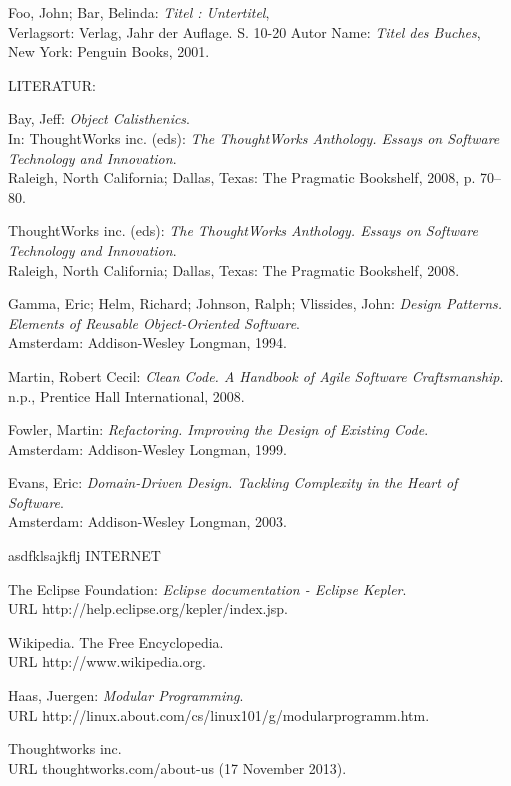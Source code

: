 \documentclass[11pt,a4paper,oneside, 
liststotoc, 					%
bibtotoc,						%
titlepage, 						%
headsepline, 					%
BCOR6mm,						%
english
]{scrreprt}
\begin{document}
\begin{thebibliography}{999999}

 Foo, John; Bar, Belinda: \emph{Titel : Untertitel},\\ Verlagsort: Verlag, Jahr der Auflage. S. 10-20
 Autor Name: \emph{Titel des Buches}, New York: Penguin Books, 2001.

LITERATUR: 

 Bay, Jeff: 
\emph{Object Calisthenics}. \\ In: ThoughtWorks inc. (eds): 
\emph{The ThoughtWorks Anthology. Essays on Software Technology and Innovation}. \\ Raleigh, North California; Dallas, Texas: The Pragmatic Bookshelf, 2008, p. 70--80.

 ThoughtWorks inc. (eds): 
\emph{The ThoughtWorks Anthology. Essays on Software Technology and Innovation}. \\ Raleigh, North California; Dallas, Texas: The Pragmatic Bookshelf, 2008.

 Gamma, Eric; Helm, Richard; Johnson, Ralph; Vlissides,  John:
\emph{Design Patterns. Elements of Reusable Object-Oriented Software}. \\ Amsterdam: Addison-Wesley Longman, 1994.
  
 Martin, Robert Cecil:
\emph{Clean Code. A Handbook of Agile Software Craftsmanship}. \\ n.p., Prentice Hall International, 2008.

 Fowler, Martin:
\emph{Refactoring. Improving the Design of Existing Code}. \\ Amsterdam: Addison-Wesley Longman, 1999. 

 Evans, Eric:
\emph{Domain-Driven Design. Tackling Complexity in the Heart of Software}. \\ Amsterdam: Addison-Wesley Longman, 2003. 

asdfklsajkflj INTERNET


 The Eclipse Foundation: 
\emph{Eclipse documentation - Eclipse Kepler}. \\ URL http://help.eclipse.org/kepler/index.jsp.

 Wikipedia. The Free Encyclopedia. \\ URL http://www.wikipedia.org. 

 Haas, Juergen: \emph{Modular Programming}.\\ URL http://linux.about.com/cs/linux101/g/modularprogramm.htm.

 Thoughtworks inc. \\ URL thoughtworks.com/about-us  (17 November 2013).

\end{thebibliography}


\begin{appendix}
\clearpage
{}						%
\end{appendix}
\end{document}
